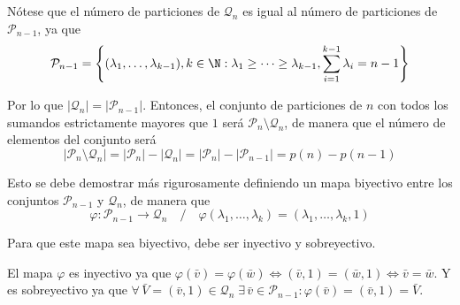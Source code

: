\documentclass[../../main.tex]{subfiles}
\begin{document}
  Nótese que el número de particiones de $\mathcal{Q}_n$ es igual al número de particiones de $\mathcal{P}_{n - 1}$, ya que
  $$
  \mathcal{P}_{n - 1} = \left\{(\lambda_1, \dots, \lambda_{k - 1}), k \in \N : \lambda_1 \geq \dots \geq \lambda_{k - 1}, \sum_{i = 1}^{k - 1} \lambda_i = n - 1 \right\}
  $$

  Por lo que $|\mathcal{Q}_{n}| = |\mathcal{P}_{n - 1}|$. Entonces, el conjunto de particiones de $n$ con todos los sumandos estrictamente mayores que $1$ será $\mathcal{P}_{n} \setminus \mathcal{Q}_{n}$, de manera que el número de elementos del conjunto será
  $$
  |\mathcal{P}_{n} \setminus \mathcal{Q}_{n}| = |\mathcal{P}_{n}| - |\mathcal{Q}_{n}| = |\mathcal{P}_{n}| - |\mathcal{P}_{n - 1}| = p(n) - p(n - 1)
  $$

  Esto se debe demostrar más rigurosamente definiendo un mapa biyectivo entre los conjuntos $\mathcal{P}_{n-1}$ y $\mathcal{Q}_{n}$, de manera que
  $$
  \varphi : \mathcal{P}_{n-1} \to \mathcal{Q}_{n} \quad / \quad \varphi(\lambda_1, \dots, \lambda_k) = (\lambda_1, \dots, \lambda_k, 1)
  $$

  Para que este mapa sea biyectivo, debe ser inyectivo y sobreyectivo.

  El mapa $\varphi$ es inyectivo ya que $\varphi(\bar{v}) = \varphi(\bar{w}) \iff (\bar{v}, 1) = (\bar{w}, 1) \iff \bar{v} = \bar{w}$. Y es sobreyectivo ya que $\forall \, \bar{V} = (\bar{v}, 1) \in \mathcal{Q}_n \; \exists \,\bar{v} \in \mathcal{P}_{n - 1} : \varphi(\bar{v}) = (\bar{v}, 1) = \bar{V}$.
\end{document}
